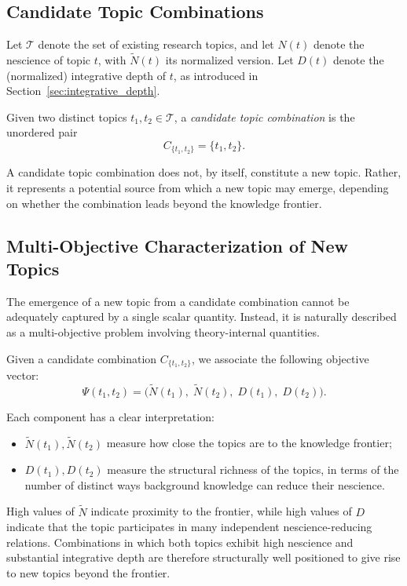 \subsection{Candidate Topic Combinations}

Let $\mathcal{T}$ denote the set of existing research topics, and let $N(t)$ denote the nescience of topic $t$, with $\tilde{N}(t)$ its normalized version. Let $D(t)$ denote the (normalized) integrative depth of $t$, as introduced in Section~\ref{sec:integrative_depth}.

\begin{definition}
Given two distinct topics $t_1,t_2 \in \mathcal{T}$, a \emph{candidate topic combination} is the unordered pair
\[
C_{\{t_1,t_2\}} = \{t_1,t_2\}.
\]
\end{definition}

\noindent
A candidate topic combination does not, by itself, constitute a new topic. Rather, it represents a potential source from which a new topic may emerge, depending on whether the combination leads beyond the knowledge frontier.

\subsection{Multi-Objective Characterization of New Topics}

The emergence of a new topic from a candidate combination cannot be adequately captured by a single scalar quantity. Instead, it is naturally described as a multi-objective problem involving theory-internal quantities.

Given a candidate combination $C_{\{t_1,t_2\}}$, we associate the following objective vector:
\[
\Psi(t_1,t_2)
=
\bigl(
\tilde{N}(t_1),\;
\tilde{N}(t_2),\;
D(t_1),\;
D(t_2)
\bigr).
\]

Each component has a clear interpretation:
\begin{itemize}
\item $\tilde{N}(t_1), \tilde{N}(t_2)$ measure how close the topics are to the knowledge frontier;
\item $D(t_1), D(t_2)$ measure the structural richness of the topics, in terms of the number of distinct ways background knowledge can reduce their nescience.
\end{itemize}

High values of $\tilde{N}$ indicate proximity to the frontier, while high values of $D$ indicate that the topic participates in many independent nescience-reducing relations. Combinations in which both topics exhibit high nescience and substantial integrative depth are therefore structurally well positioned to give rise to new topics beyond the frontier.

